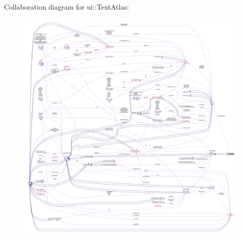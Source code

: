 Collaboration diagram for ui\+:\+:Text\+Atlas\+:
\nopagebreak
\begin{figure}[H]
\begin{center}
\leavevmode
\includegraphics[width=350pt]{classui_1_1TextAtlas__coll__graph}
\end{center}
\end{figure}
